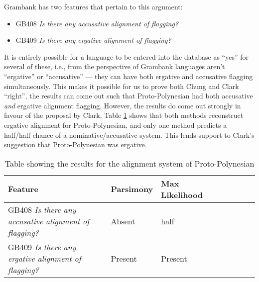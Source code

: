\documentclass[a4paper,10pt]{article} %
\begin{document}
Grambank has two features that pertain to this argument:

\begin{itemize}
\item GB408 \emph{Is there any accusative alignment of flagging?}
\item GB409 \emph{Is there any ergative alignment of flagging?}
\end{itemize}

It is entirely possible for a language to be entered into the database as ``yes'' for several of these, i.e., from the perspective of Grambank languages aren't ``ergative'' or ``accusative'' --- they can have both ergative and accusative flagging simultaneously. This makes it possible for us to prove both Chung and Clark ``right'', the results can come out such that Proto-Polynesian had both accusative \emph{and} ergative alignment flagging. However, the results do come out strongly in favour of the proposal by Clark. Table \ref{proto_poly_erg_table} shows that both methods reconstruct ergative alignment for Proto-Polynesian, and only one method predicts a half/half chance of a nominative/accusative system. This lends support to Clark's suggestion that Proto-Polynesian was ergative.

\begin{table}[H]
\centering
\caption{Table showing the results for the alignment system of Proto-Polynesian}
\label{proto_poly_erg_table}
\begin{tabular}{|l|l|l|l|l|l|l|l|}
\hline
Feature & \textbf{Parsimony}& \textbf{Max Likelihood} \\ \hline
GB408 \emph{Is there any accusative alignment of flagging?} &Absent & half \\
GB409 \emph{Is there any ergative alignment of flagging?} & Present & Present \\
\end{tabular}
\end{table}
\end{document}
